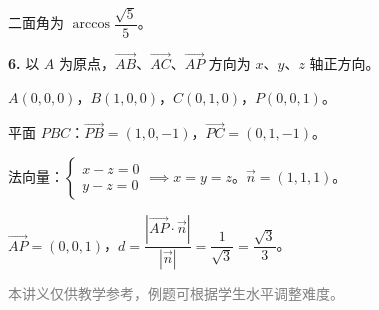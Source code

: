 \documentclass[12pt, a4paper]{ctexart}
\begin{document}
\begin{knowledgebox}[参考答案]
二面角为 $\arccos\dfrac{\sqrt{5}}{5}$。

\bigskip
\textbf{6.}
以 $A$ 为原点，$\overrightarrow{AB}$、$\overrightarrow{AC}$、$\overrightarrow{AP}$ 方向为 $x$、$y$、$z$ 轴正方向。

$A(0,0,0)$，$B(1,0,0)$，$C(0,1,0)$，$P(0,0,1)$。

平面 $PBC$：$\overrightarrow{PB}=(1,0,-1)$，$\overrightarrow{PC}=(0,1,-1)$。

法向量：$\begin{cases}x-z=0\\y-z=0\end{cases}\implies x=y=z$。$\vec{n}=(1,1,1)$。

$\overrightarrow{AP}=(0,0,1)$，$d=\dfrac{|\overrightarrow{AP}\cdot\vec{n}|}{|\vec{n}|}=\dfrac{1}{\sqrt{3}}=\dfrac{\sqrt{3}}{3}$。

\end{knowledgebox}

\vfill
\begin{center}
\small\textcolor{gray}{本讲义仅供教学参考，例题可根据学生水平调整难度。}
\end{center}
\end{document}
